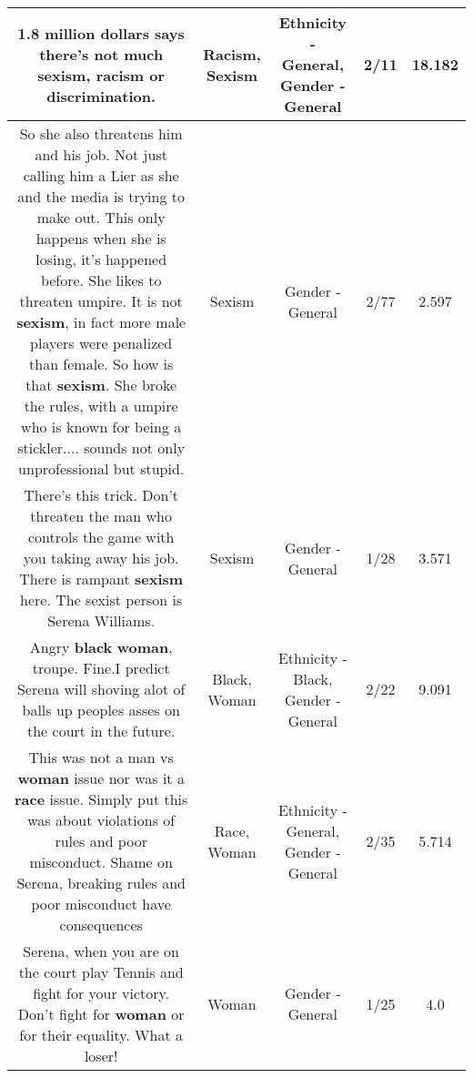\documentclass[11pt]{article}
\newlength\mylength
\begin{document}
\begin{center}
\begin{longtable}{|C{.65\mylength}|C{.30\mylength}|C{.12\mylength}|C{.12\mylength}|C{.12\mylength}|}
  \small 1.8 million dollars says there's not much \textbf{sexism}, \textbf{racism} or discrimination.\normalsize   & Racism, Sexism & Ethnicity - General, Gender - General & 2/11 & 18.182 \\  \hline
  \small So she also threatens him and his job. Not just calling him a Lier as she and the media is trying to make out. This only happens when she is losing, it's happened before. She likes to threaten umpire. It is not \textbf{sexism}, in fact more male players were penalized than female. So how is that \textbf{sexism}. She broke the rules, with a umpire who is known for being a stickler.... sounds not only unprofessional but stupid.\normalsize   & Sexism & Gender - General & 2/77 & 2.597 \\  \hline
  \small There's this trick. Don't threaten the man who controls the game with you taking away his job. There is rampant \textbf{sexism} here. The sexist person  is Serena Williams.\normalsize   & Sexism & Gender - General & 1/28 & 3.571 \\  \hline
  \small Angry \textbf{black} \textbf{woman}, troupe. Fine.I predict Serena will shoving alot of balls up peoples asses on the court in the future.\normalsize   & Black, Woman & Ethnicity - Black, Gender - General & 2/22 & 9.091 \\  \hline
  \small This was not a man vs \textbf{woman} issue nor was it a \textbf{race} issue. Simply put this was about violations of rules and poor misconduct. Shame on Serena, breaking rules and poor misconduct have consequences\normalsize   & Race, Woman & Ethnicity - General, Gender - General & 2/35 & 5.714 \\  \hline
  \small Serena, when you are on the court play Tennis and fight for your victory. Don't fight for \textbf{woman} or for their equality.  What a loser!\normalsize   & Woman & Gender - General & 1/25 & 4.0 \\  \hline

\end{longtable}
\end{center}
\end{document}
